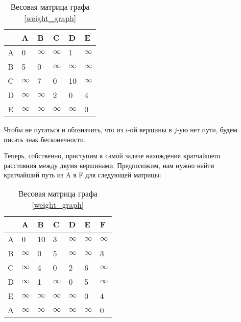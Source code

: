 \begin{table}[h]
    \centering
    \begin{tabular}[c]{ | l | l | l | l | l | l | }
        \hline
          & A & B & C & D & E \\ \hline
        A & 0 & $\infty$ & $\infty$ & 1 & $\infty$ \\ \hline
        B & 5 & 0 & $\infty$ & $\infty$ & $\infty$ \\ \hline
        C & $\infty$ & 7 & 0 & 10 & $\infty$ \\ \hline
        D & $\infty$ & $\infty$ & 2 & 0 & 4 \\ \hline
        E & $\infty$ & $\infty$ & $\infty$ & $\infty$ & 0 \\
        \hline
    \end{tabular}
    \caption{Весовая матрица графа \ref{weight_graph}}
\end{table}
Чтобы не путаться и обозначить, что из $i$-ой вершины в $j$-ую нет пути, будем писать знак 
бесконечности.

Теперь, собственно, приступим к самой задаче нахождения кратчайшего расстояния между двумя вершинами.
Предположим, нам нужно найти кратчайший путь из A в F для следующей матрицы:
\begin{table}[h]
    \centering
    \begin{tabular}[c]{ | l | l | l | l | l | l | l | }
        \hline
          & A & B & C & D & E & F \\ \hline
        A & 0 & 10 & 3 & $\infty$ & $\infty$ & $\infty$ \\ \hline
        B & $\infty$ & 0 & 5 & $\infty$ & $\infty$ & 3 \\ \hline
        C & $\infty$ & 4 & 0 & 2 & 6 & $\infty$ \\ \hline
        D & $\infty$ & 1 & $\infty$ & 0 & 5 & $\infty$ \\ \hline
        E & $\infty$ & $\infty$ & $\infty$ & $\infty$ & 0 & 4 \\ \hline
        А & $\infty$ & $\infty$ & $\infty$ & $\infty$ & $\infty$ & 0 \\
        \hline
    \end{tabular}
    \caption{Весовая матрица графа \ref{weight_graph}}
\end{table}